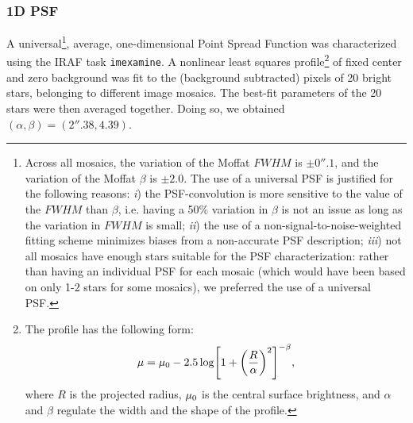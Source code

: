 \documentclass[preprint2]{emulateapj}
\begin{document}
\subsubsection{1D PSF}
A universal\footnote{Across all mosaics, the variation of the Moffat $FWHM$ is $\pm 0''.1$, 
and the variation of the Moffat $\beta$ is $\pm 2.0$.
The use of a universal PSF is justified for the following reasons: 
\emph{i}) the PSF-convolution is more sensitive to the value of the $FWHM$ than $\beta$, 
i.e. having a 50\% variation in $\beta$ is not an issue as long as the variation in $FWHM$ is small;
\emph{ii}) the use of a non-signal-to-noise-weighted fitting scheme minimizes biases from a non-accurate PSF description;
\emph{iii}) not all mosaics have enough stars suitable for the PSF characterization: 
rather than having an individual PSF for each mosaic (which would have been based on only 1-2 stars for some mosaics), 
we preferred the use of a universal PSF.}, 
average, one-dimensional Point Spread Function was characterized using the IRAF task {\tt imexamine}.
A nonlinear least squares \cite{moffat1969} profile\footnote{The \citep{moffat1969} profile 
has the following form:
\begin{equation}
\mu = \mu_{\rm 0} - 2.5 \log \Biggl[ 1 + \biggl( \frac{R}{\alpha} \biggr)^2 \Biggr]^{-\beta} ,
\end{equation}
where $R$ is the projected radius, $\mu_{\rm 0}$ is the central surface brightness, and 
$\alpha$ and $\beta$ regulate the width and the shape of the profile.} 
of fixed center and zero background was fit to the 
(background subtracted) pixels of 20 bright stars, belonging to different image mosaics.
The best-fit parameters of the 20 stars were then averaged together. 
Doing so, we obtained 
$(\alpha, \beta) = (2''.38, 4.39)$.
\end{document}
